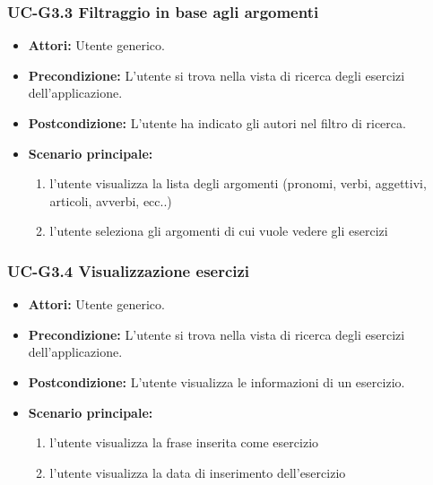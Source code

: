 	\subsubsection{UC-G3.3 Filtraggio in base agli argomenti}
		\begin{itemize}
			\item \textbf{Attori:} Utente generico.
			\item \textbf{Precondizione: } L'utente si trova nella vista di ricerca degli esercizi dell'applicazione.
			\item \textbf{Postcondizione: } L'utente ha indicato gli autori nel filtro di ricerca.
			\item \textbf{Scenario principale:}
			\begin{enumerate}
				\item l'utente visualizza la lista degli argomenti (pronomi, verbi, aggettivi, articoli, avverbi, ecc..)
				\item l'utente seleziona gli argomenti di cui vuole vedere gli esercizi
			\end{enumerate}
		\end{itemize}
		
\subsubsection{UC-G3.4 Visualizzazione esercizi}
		\begin{itemize}
			\item \textbf{Attori:} Utente generico.
			\item \textbf{Precondizione: } L'utente si trova nella vista di ricerca degli esercizi dell'applicazione.
			\item \textbf{Postcondizione: } L'utente visualizza le informazioni di un esercizio.
			\item \textbf{Scenario principale:}
			\begin{enumerate}
				\item l'utente visualizza la frase inserita come esercizio
				\item l'utente visualizza la data di inserimento dell'esercizio
			\end{enumerate}
		\end{itemize}

